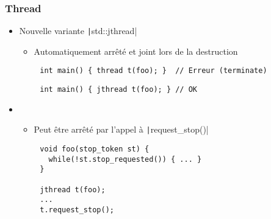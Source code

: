 \documentclass[C++.tex]{subfiles}
\begin{document}
\begin{frame}[fragile]
	\frametitle{Thread}
	\begin{itemize}
		\item Nouvelle variante \texttt|std::jthread|
		\begin{itemize}
			\item Automatiquement arrêté et joint lors de la destruction
		\end{itemize}
	\end{itemize}

	\begin{verbatim}
		int main() { thread t(foo); }  // Erreur (terminate)
	\end{verbatim}


	\begin{verbatim}
		int main() { jthread t(foo); } // OK
	\end{verbatim}

	\begin{itemize}
		\item [] \begin{itemize}
			\item Peut être arrêté par l'appel à \texttt|request_stop()|
		\end{itemize}
	\end{itemize}

	\begin{verbatim}
		void foo(stop_token st) {
		  while(!st.stop_requested()) { ... }
		}

		jthread t(foo);
		...
		t.request_stop();
	\end{verbatim}


\end{frame}
\end{document}
